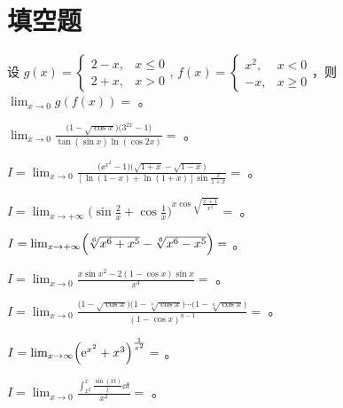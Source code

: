 \section{填空题}
\begin{ti}
	设 $g(x) = \begin{cases}
		2 - x, & x \leq 0 \\
		2 + x, & x > 0
	\end{cases}$, $f(x) = \begin{cases}
		x^{2}, & x < 0 \\
		-x, & x \geq 0
	\end{cases}$，则 $\lim_{x \to 0} g(f(x)) = $ \hua。
\end{ti}

\begin{ti}
	$\lim_{x \to 0}\frac{ \bigl( 1 - \sqrt{\cos x} \bigr) \bigl( 3^{2x} - 1 \bigr) }{\tan(\sin x) \ln (\cos 2x)} = $ \hua。
\end{ti}

\begin{ti}
	$I = \lim_{x \to 0} \frac{ \bigl( \ee^{x^2} - 1 \bigr) \bigl( \sqrt{1 + x} - \sqrt{1 - x} \bigr)  }{ [\ln(1 - x) + \ln(1 + x)] \sin \frac{x}{1+x} } = $ \hua。
\end{ti}

\begin{ti}
	$I = \lim_{x \to +\infty} \biggl( \sin \frac{2}{x} + \cos \frac{1}{x} \biggr)^{x \cos \sqrt{\frac{x+1}{x^{2}}}} = $ \hua。
\end{ti}

\begin{ti}
	$I = \lim_{x \to +\infty} \Bigl( \sqrt[6]{x^{6} + x^{5}} - \sqrt[6]{x^{6} - x^{5}} \Bigr) = $ \hua。
\end{ti}

\begin{ti}
	$I = \lim_{x \to 0} \frac{x \sin x^2 - 2 (1 - \cos x) \sin x}{x^4} = $ \hua。
\end{ti}

\begin{ti}
	$I = \lim_{x \to 0} \frac{\bigl( 1 - \sqrt{\cos x} \bigr) \bigl( 1 - \sqrt[3]{\cos x} \bigr) \cdots \bigl( 1 - \sqrt[n]{\cos x} \bigr)}{(1 - \cos x)^{n-1}} = $ \hua。
\end{ti}

\begin{ti}
	$I = \lim_{x \to \infty} \Bigl( \mathrm{e}^{x^2} + x^3 \Bigr)^{\frac{1}{x^2}} = $ \hua。
\end{ti}

\begin{ti}
	$I = \lim_{x \to 0} \frac{\int_{x^2}^x \frac{\sin(xt)}{t} \dd{t}}{x^2} = $ \hua。
\end{ti}

